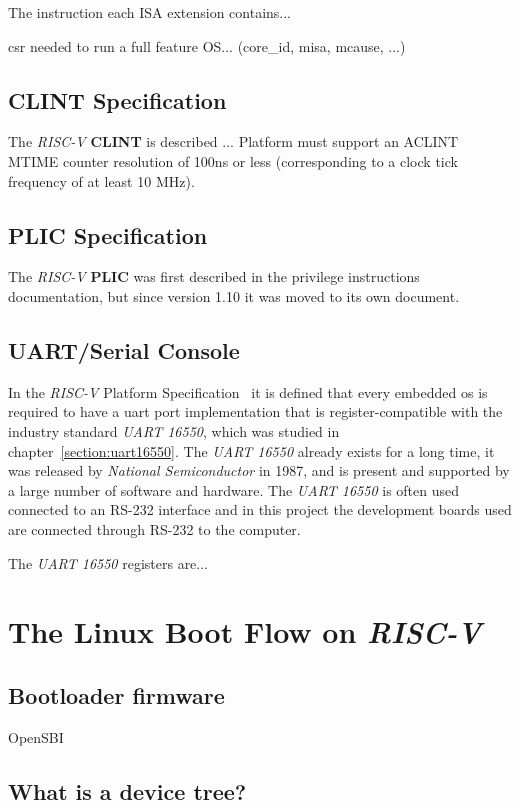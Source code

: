 The instruction each ISA extension contains...

\acrfull{csr} needed to run a full feature OS... (core\_id, misa, mcause, ...)

\subsection{CLINT Specification}
The \textit{RISC-V} \textbf{CLINT} is described ...
Platform must support an ACLINT MTIME counter resolution of 100ns or less (corresponding to a clock tick frequency of at least 10 MHz).

\subsection{PLIC Specification}
The \textit{RISC-V} \textbf{PLIC} was first described in the privilege instructions documentation, but since version 1.10 it was moved to its own document.

\subsection{UART/Serial Console}
\label{section:serial_console}
In the \textit{RISC-V} Platform Specification~\cite{riscv_platform_specification} it is defined that every embedded \acrfull{os} is required to have a \acrshort{uart} port implementation that is register-compatible with the industry standard \textit{UART 16550}, which was studied in chapter~\ref{section:uart16550}. The \textit{UART 16550} already exists for a long time, it was released by \textit{National Semiconductor} in 1987, and is present and supported by a large number of software and hardware. The \textit{UART 16550} is often used connected to an RS-232 interface and in this project the development boards used are connected through RS-232 to the computer.

The \textit{UART 16550} registers are...

\section{The Linux Boot Flow on \textit{RISC-V}}
\label{section:linux_boot_flow}
\subsection{Bootloader firmware}
OpenSBI
\subsection{What is a device tree?}

